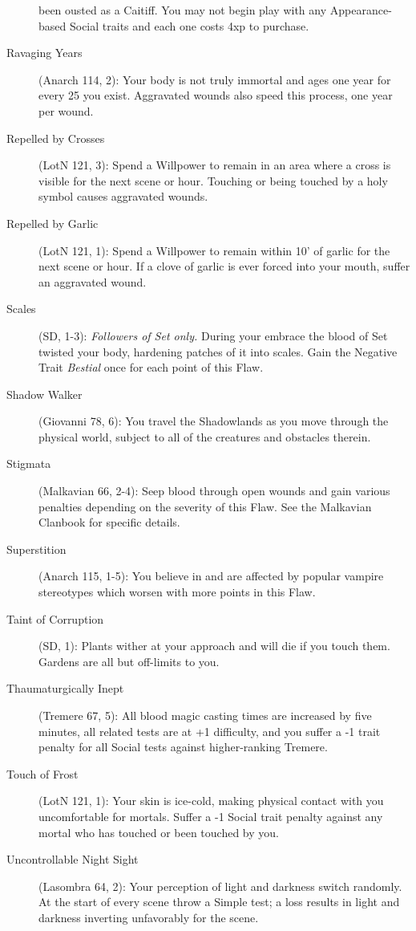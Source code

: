 \begin{description}
	been ousted as a Caitiff.  You may not begin play with any Appearance-based Social traits and each one costs 
	4xp to purchase.
	\item[Ravaging Years] (Anarch 114, 2):  Your body is not truly immortal and ages one year for every 
	25 you exist.  Aggravated wounds also speed this process, one year per wound.
	\item[Repelled by Crosses] (LotN 121, 3):  Spend a Willpower to remain in an area where a cross is 
	visible for the next scene or hour.  Touching or being touched by a holy symbol causes aggravated wounds.
	\item[Repelled by Garlic] (LotN 121, 1):  Spend a Willpower to remain within 10' of garlic for the next 
	scene or hour.  If a clove of garlic is ever forced into your mouth, suffer an aggravated wound.
	\item[Scales] (SD, 1-3):  \emph{Followers of Set only.}  During your embrace the blood of 
	Set twisted your body, hardening patches of it into scales.  Gain the Negative Trait \emph{Bestial} 
	once for each point of this Flaw.
	\item[Shadow Walker] (Giovanni 78, 6):  You travel the Shadowlands as you move through the physical 
	world, subject to all of the creatures and obstacles therein.
	\item[Stigmata] (Malkavian 66, 2-4):  Seep blood through open wounds and gain various penalties 
	depending on the severity of this Flaw.  See the Malkavian Clanbook for specific details.
	\item[Superstition] (Anarch 115, 1-5):  You believe in and are affected by popular vampire 
	stereotypes which worsen with more points in this Flaw.
	\item[Taint of Corruption] (SD, 1):  Plants wither at your approach and will die if you 
	touch them.  Gardens are all but off-limits to you.
	\item[Thaumaturgically Inept] (Tremere 67, 5):  All blood magic casting times are increased by 
	five minutes, all related tests are at +1 difficulty, and you suffer a -1 trait penalty for all 
	Social tests against higher-ranking Tremere.
	\item[Touch of Frost] (LotN 121, 1):  Your skin is ice-cold, making physical contact with you 
	uncomfortable for mortals.  Suffer a -1 Social trait penalty against any mortal who has touched or 
	been touched by you.
	\item[Uncontrollable Night Sight] (Lasombra 64, 2):  Your perception of light and darkness 
	switch randomly.  At the start of every scene throw a Simple test; a loss results in light and 
	darkness inverting unfavorably for the scene.
\end{description}